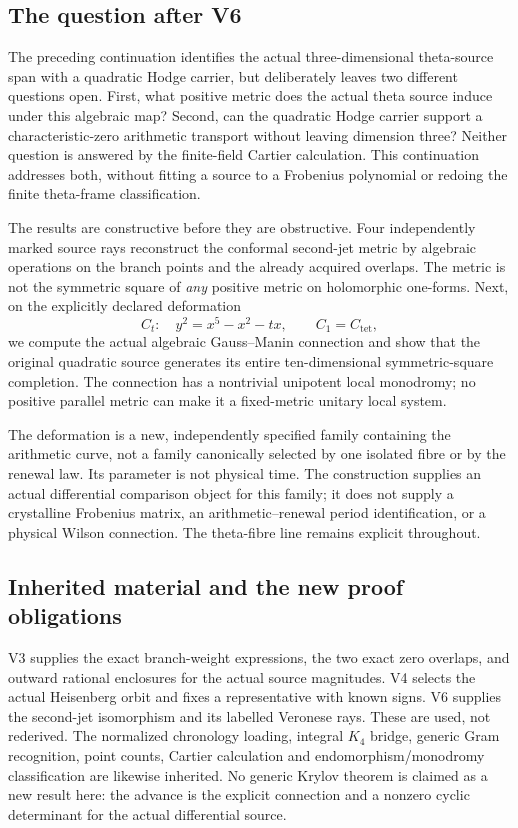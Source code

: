 \documentclass[11pt]{article}
\theoremstyle{definition}
\theoremstyle{remark}
\begin{document}
\subsection{The question after V6}
The preceding continuation identifies the actual three-dimensional theta-source
span with a quadratic Hodge carrier, but deliberately leaves two different
questions open. First, what positive metric does the actual theta source induce
under this algebraic map? Second, can the quadratic Hodge carrier support a
characteristic-zero arithmetic transport without leaving dimension three?
Neither question is answered by the finite-field Cartier calculation.
This continuation addresses both, without fitting a source to a Frobenius
polynomial or redoing the finite theta-frame classification.

The results are constructive before they are obstructive. Four independently
marked source rays reconstruct the conformal second-jet metric by algebraic
operations on the branch points and the already acquired overlaps. The metric
is not the symmetric square of \emph{any} positive metric on holomorphic
one-forms. Next, on the explicitly declared deformation
\[
 C_t:\quad y^2=x^5-x^2-tx,\qquad C_1=C_{\mathrm{tet}},
\]
we compute the actual algebraic Gauss--Manin connection and show that the
original quadratic source generates its entire ten-dimensional symmetric-square
completion. The connection has a nontrivial unipotent local monodromy; no
positive parallel metric can make it a fixed-metric unitary local system.

The deformation is a new, independently specified family containing the
arithmetic curve, not a family canonically selected by one isolated fibre or by
the renewal law. Its parameter is not physical time. The construction supplies
an actual differential comparison object for this family; it does not supply a
crystalline Frobenius matrix, an arithmetic--renewal period identification, or a
physical Wilson connection. The theta-fibre line remains explicit throughout.

\subsection{Inherited material and the new proof obligations}
V3 supplies the exact branch-weight expressions, the two exact zero overlaps,
and outward rational enclosures for the actual source magnitudes. V4 selects
the actual Heisenberg orbit and fixes a representative with known signs.
V6 supplies the second-jet isomorphism and its labelled Veronese rays. These
are used, not rederived. The normalized chronology loading, integral $K_4$
bridge, generic Gram recognition, point counts, Cartier calculation and
endomorphism/monodromy classification are likewise inherited. No generic
Krylov theorem is claimed as a new result here: the advance is the explicit
connection and a nonzero cyclic determinant for the actual differential source.
\end{document}
